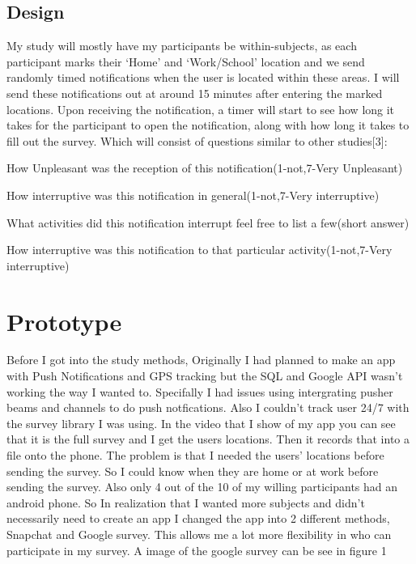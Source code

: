 \documentclass{vgtc}                          %
\begin{document}
\subsection{Design}
 My study will mostly have my participants be within-subjects, as each participant marks their ‘Home’ and ‘Work/School’ location and we send randomly timed notifications when the user is located within these areas. I will send these notifications out at around 15 minutes after entering the marked locations. Upon receiving the notification, a timer will start to see how long it takes for the participant to open the notification, along with how long it takes to fill out the survey. Which will consist of questions similar to other studies[3]:
\item
How Unpleasant was the reception of this notification(1-not,7-Very Unpleasant)
\item
How interruptive was this notification in general(1-not,7-Very interruptive)
\item
What activities did this notification interrupt feel free to list a few(short answer)
\item
How interruptive was this notification to that particular activity(1-not,7-Very interruptive)
\section{Prototype}
Before I got into the study methods, Originally I had planned to make an app with Push Notifications and GPS tracking but the SQL and Google API wasn’t working the way I wanted to. Specifally I had issues using intergrating pusher beams and channels to do push notfications. Also I couldn't track user 24/7 with the survey library I was using. In the video that I show of my app you can see that it is the full survey and I get the users locations. Then it records that into a file onto the phone. The problem is that I needed the users' locations before sending the survey. So I could know when they are home or at work before sending the survey. Also only 4 out of the 10 of my willing participants had an android phone. So In realization that I wanted more subjects and didn’t necessarily need to create an app I changed the app into 2 different methods, Snapchat and Google survey. This allows me a lot more flexibility in who can participate in my survey. A image of the google survey can be see in figure 1
\end{document}
